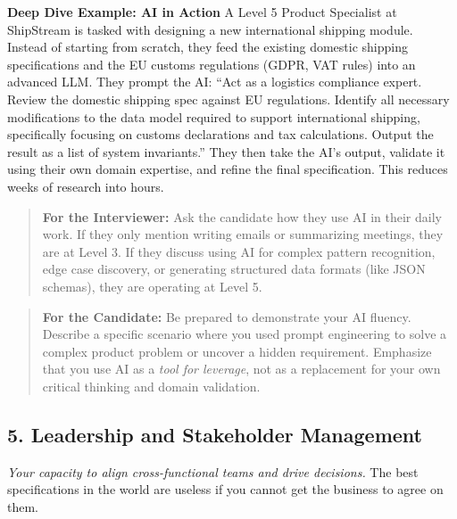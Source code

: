 \textbf{Deep Dive Example: AI in Action} A Level 5 Product Specialist at
ShipStream is tasked with designing a new international shipping module.
Instead of starting from scratch, they feed the existing domestic
shipping specifications and the EU customs regulations (GDPR, VAT rules)
into an advanced LLM. They prompt the AI: ``Act as a logistics
compliance expert. Review the domestic shipping spec against EU
regulations. Identify all necessary modifications to the data model
required to support international shipping, specifically focusing on
customs declarations and tax calculations. Output the result as a list
of system invariants.'' They then take the AI's output, validate it
using their own domain expertise, and refine the final specification.
This reduces weeks of research into hours.

\begin{quote}
\textbf{For the Interviewer:} Ask the candidate how they use AI in their
daily work. If they only mention writing emails or summarizing meetings,
they are at Level 3. If they discuss using AI for complex pattern
recognition, edge case discovery, or generating structured data formats
(like JSON schemas), they are operating at Level 5.
\end{quote}

\begin{quote}
\textbf{For the Candidate:} Be prepared to demonstrate your AI fluency.
Describe a specific scenario where you used prompt engineering to solve
a complex product problem or uncover a hidden requirement. Emphasize
that you use AI as a \emph{tool for leverage}, not as a replacement for
your own critical thinking and domain validation.
\end{quote}

\subsection{5. Leadership and Stakeholder
Management}\label{leadership-and-stakeholder-management}

\emph{Your capacity to align cross-functional teams and drive
decisions.} The best specifications in the world are useless if you
cannot get the business to agree on them.

